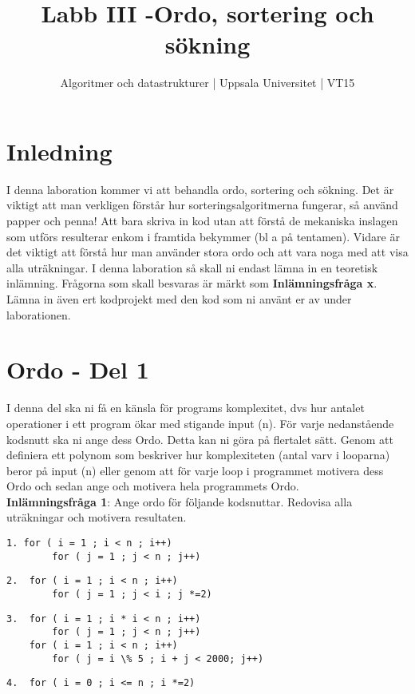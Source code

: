 \documentclass{article}
\begin{document}
  \title{Labb III -Ordo, sortering och sökning }
  \author{ Algoritmer och datastrukturer | Uppsala Universitet | VT15 }
  \date{}
  \maketitle


  \section*{Inledning}
   I denna laboration kommer vi att behandla ordo, sortering och sökning. Det är viktigt att
   man verkligen förstår hur sorteringsalgoritmerna fungerar, så använd papper och penna!
   Att bara skriva in kod utan att förstå de mekaniska inslagen som utförs resulterar enkom i
   framtida bekymmer (bl a på tentamen). Vidare är det viktigt att förstå hur man använder
   stora ordo och att vara noga med att visa alla uträkningar. I denna laboration så skall ni endast lämna in en teoretisk inlämning. Frågorna som skall besvaras är märkt som \textbf{Inlämningsfråga x}. Lämna in även ert kodprojekt med den kod som ni använt er av under laborationen.
   



  \section*{Ordo - Del 1
  }

  I denna del ska ni få en känsla för programs komplexitet, dvs hur antalet operationer i ett
  program ökar med stigande input (n). För varje nedanstående kodsnutt ska ni ange dess
  Ordo. Detta kan ni göra på flertalet sätt. Genom att definiera ett polynom som beskriver
  hur komplexiteten (antal varv i looparna) beror på input (n) eller genom att för varje loop
  i programmet motivera dess Ordo och sedan ange och motivera hela programmets Ordo. \\
  
  \textbf{Inlämningsfråga 1}: Ange ordo för följande kodsnuttar. Redovisa alla uträkningar och motivera resultaten.
  
  
  
  
   \begin{lstlisting}
1. for ( i = 1 ; i < n ; i++)
		for ( j = 1 ; j < n ; j++)
    \end{lstlisting}
    
    \begin{lstlisting}     
2.	for ( i = 1 ; i < n ; i++)
		for ( j = 1 ; j < i ; j *=2) 
    \end{lstlisting}
    \begin{lstlisting}
3.	for ( i = 1 ; i * i < n ; i++)
		for ( j = 1 ; j < n ; j++) 
    for ( i = 1 ; i < n ; i++)
		for ( j = i \% 5 ; i + j < 2000; j++) 
    \end{lstlisting} 
    \begin{lstlisting}   
4.	for ( i = 0 ; i <= n ; i *=2)
    \end{lstlisting}
\end{document}
